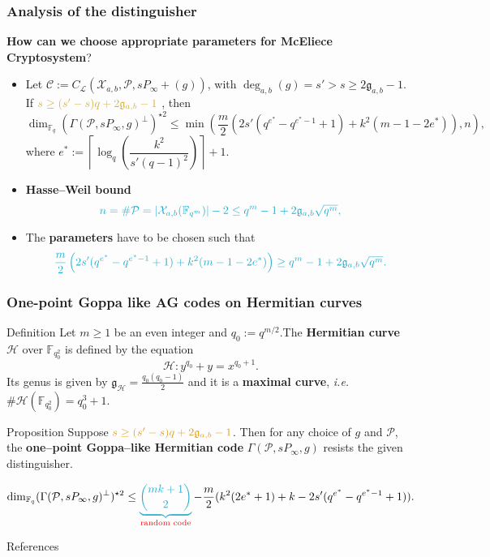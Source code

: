 \documentclass[
10pt, %
%
aspectratio=169, %
]{beamer}
\theoremstyle{plain}%
\theoremstyle{definition}
\theoremstyle{remark}
\newcommand{\calP}{\mathcal{P}}
\newcommand{\calH}{\mathcal{H}}
\newcommand{\calL}{\mathcal{L}}
\newcommand{\calC}{\mathcal{C}}
\newcommand{\calX}{\mathcal{X}}
\newcommand{\fqm}{\mathbb{F}_{q^m}}
\newcommand{\fq}{\mathbb{F}_{q}}
\newcommand{\fqo}{\mathbb{F}_{q_0^2}}
\newcommand{\degab}[1]{\deg_{a,b}\left(#1\right)}
\begin{document}
\begin{frame}
	\frametitle{Analysis of the distinguisher}
	\textcolor{applegreen}{\textbf{How can we choose appropriate parameters for McEliece Cryptosystem}?}
	\begin{itemize}
		\item Let $\calC := C_\calL(\calX_{a,b},\calP,sP_\infty +(g))$, with $\degab{g} = s'>s\geq 2\mathfrak{g}_{a,b}-1$. If $\mathcolor{gold}{s \geq (s'-s)q+2\mathfrak{g}_{a,b}-1}$ , then
		\[ \dim_{\fq} (\Gamma(\calP,sP_\infty,g)^{\perp})^{\star 2} \leq \min \left(\frac{m}{2}\left(2s'(q^{e^*}-q^{e^*-1}+1)+k^2(m-1-2e^*)  \right),n\right),\]	
		where $e^* := \left\lceil \log_q\left(\dfrac{k^2}{s'(q-1)^2}\right)\right\rceil+1$.
		\item \textbf{Hasse--Weil bound }
		\[\color{ballblue}{n = \# \calP = |\calX_{a,b}(\fqm)|-2 \leq q^m-1+2\mathfrak{g}_{a,b}\sqrt{q^m}},\]
		\item The \textbf{parameters} have to be chosen such that 
		\[\color{ballblue}{\frac{m}{2}\left(2s'(q^{e^*}-q^{e^*-1}+1)+k^2(m-1-2e^*)  \right)\geq q^m-1+2\mathfrak{g}_{a,b}\sqrt{q^m}}.\]	
		
	\end{itemize}
\end{frame}
\begin{frame}
	\frametitle{One-point Goppa like AG codes on Hermitian curves}
	\begin{block}{Definition }
		Let $m \geq 1$ be an even integer and $q_0 := q^{m/2}$.The \textbf{Hermitian curve} $\calH$ over $\fqo$ is defined by the equation
		\[\calH : y^{q_0}+y = x^{q_0+1}.\]
		Its genus is given by $\mathfrak{g}_{\calH} = \frac{q_0(q_0-1)}{2}$ and it is a \textbf{maximal curve}, \emph{i.e.} $\#\calH(\fqo) = q_0^3+1$.
	\end{block}
	
	\begin{block}{Proposition \cite{lhotel2023goppa}} 
		Suppose $\mathcolor{gamboge}{s \geq (s'-s)q+2\mathfrak{g}_{a,b}-1}$. Then for any choice of $g$ and $\calP$, the \textbf{one--point Goppa--like Hermitian code} $\Gamma(\calP,sP_\infty,g)$ resists the given distinguisher.
	\end{block}
\begin{tcolorbox}[colback=aliceblue]
	$$\dim_{\fq} (\Gamma(\calP,sP_\infty,g)^{\perp})^{\star 2}\leq \mathcolor{ballblue}{\underbrace{\binom{mk+1}{2}}}_{\text{\textcolor{red}{random code}}} - \dfrac{m}{2}(k^2(2e^*+1)+k-2s'(q^{e^*}-q^{e^*-1}+1)). $$
\end{tcolorbox}
\end{frame}
	\begin{frame}[allowframebreaks]{References}
		
		
		
		
	\end{frame}
	
\end{document}
